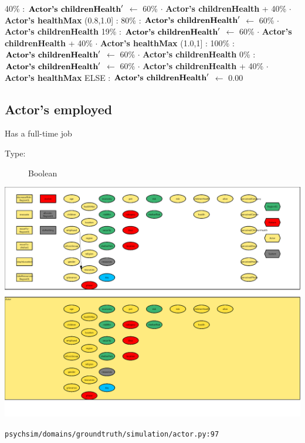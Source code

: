 \documentclass{article}%
\begin{document}
\begin{flushleft}
40\%%
: %
$\mbox{\textbf{Actor's childrenHealth}} '$%
$\leftarrow$%
60\%%
$\cdot$%
\textbf{Actor's childrenHealth}%
+%
40\%%
$\cdot$%
\textbf{Actor's healthMax}%
\linebreak%
\hspace*{4em}%
(0.8,1.0{]}%
: %
\linebreak%
\hspace*{6em}%
80\%%
: %
$\mbox{\textbf{Actor's childrenHealth}} '$%
$\leftarrow$%
60\%%
$\cdot$%
\textbf{Actor's childrenHealth}%
\linebreak%
\hspace*{6em}%
19\%%
: %
$\mbox{\textbf{Actor's childrenHealth}} '$%
$\leftarrow$%
60\%%
$\cdot$%
\textbf{Actor's childrenHealth}%
+%
40\%%
$\cdot$%
\textbf{Actor's healthMax}%
\linebreak%
\hspace*{4em}%
(1.0,1{]}%
: %
\linebreak%
\hspace*{6em}%
100\%%
: %
$\mbox{\textbf{Actor's childrenHealth}} '$%
$\leftarrow$%
60\%%
$\cdot$%
\textbf{Actor's childrenHealth}%
\linebreak%
\hspace*{6em}%
0\%%
: %
$\mbox{\textbf{Actor's childrenHealth}} '$%
$\leftarrow$%
60\%%
$\cdot$%
\textbf{Actor's childrenHealth}%
+%
40\%%
$\cdot$%
\textbf{Actor's healthMax}%
\linebreak%
\hspace*{2em}%
ELSE %
: %
$\mbox{\textbf{Actor's childrenHealth}} '$%
$\leftarrow$%
0.00%
\end{flushleft}

%
\subsection{Actor's employed}%
\label{subsec:Actor's employed}%
Has a full{-}time job%
\begin{description}%
\item[Type:]%
Boolean%
\end{description}%
\includegraphics[width=\textwidth]{images/employedOfActor.png}%
\begin{flushleft}%
\verb|psychsim/domains/groundtruth/simulation/actor.py:97|%
\end{flushleft}
\end{document}

